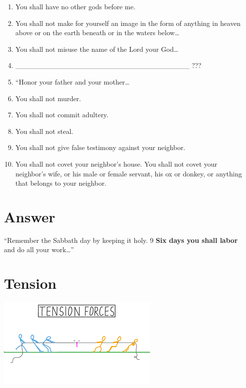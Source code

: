 \documentclass[
]{book}
\providecommand{\tightlist}{%
  \setlength{\itemsep}{0pt}\setlength{\parskip}{0pt}}
\begin{document}
\begin{enumerate}
\def\labelenumi{\arabic{enumi}.}
\tightlist
\item
  You shall have no other gods before me.
\item
  You shall not make for yourself an image in the form of anything in heaven above or on the earth beneath or in the waters below\ldots{}
\item
  You shall not misuse the name of the Lord your God\ldots{}
\item
  \_\_\_\_\_\_\_\_\_\_\_\_\_\_\_\_\_\_\_\_\_\_\_\_\_\_\_\_\_\_\_\_\_\_ ???
\item
  ``Honor your father and your mother\ldots{}
\item
  You shall not murder.
\item
  You shall not commit adultery.
\item
  You shall not steal.
\item
  You shall not give false testimony against your neighbor.
\item
  You shall not covet your neighbor's house. You shall not covet your neighbor's wife, or his male or female servant, his ox or donkey, or anything that belongs to your neighbor.
\end{enumerate}

\hypertarget{answer}{%
\chapter{Answer}\label{answer}}

``Remember the Sabbath day by keeping it holy. 9 \textbf{Six days you shall labor} and do all your work\ldots{}''

\hypertarget{tension}{%
\chapter{Tension}\label{tension}}

\begin{center}\includegraphics[width=1\linewidth]{_images/tension} \end{center}
\end{document}
